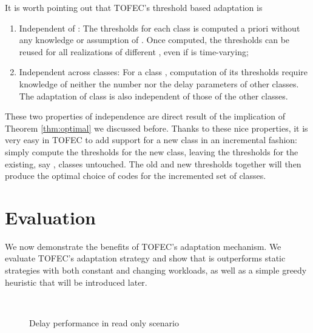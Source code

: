 \documentclass[journal]{IEEEtran}
\newcommand{\ourproposal}{TOFEC\xspace}
\newcommand{\onewidth}{0.74\columnwidth}
\begin{document}
It is worth pointing out that \ourproposal's threshold based adaptation is 
\begin{enumerate}
	\item Independent of : The thresholds for each class is computed a priori without any knowledge or assumption of . Once computed, the thresholds can be reused for all realizations of different , even if  is time-varying;
	\item Independent across classes: For a class , computation of its thresholds  require knowledge of neither the number nor the delay parameters of other classes. The adaptation of class  is also independent of those of the other classes.
\end{enumerate}
These two properties of independence are direct result of the implication of Theorem \ref{thm:optimal} we discussed before.
Thanks to these nice properties, it is very easy in \ourproposal to add support for a new class in an incremental fashion: simply compute the thresholds for the new class, leaving the thresholds for the existing, say , classes untouched. The old and new thresholds together will then produce the optimal choice of codes for the incremented set of  classes.






\section{Evaluation}
\label{sec:evaluation}

We now demonstrate the benefits of \ourproposal 's adaptation mechanism. 
We evaluate \ourproposal's adaptation strategy and show that is outperforms static strategies with both constant and changing workloads, as well as a simple greedy heuristic that will be introduced later.








\begin{figure*}[!t]
\centering
\null\hfill
	\hfill
\hfill\null
\\
\null\hfill
\hfill
\hfill\null
\caption{Delay performance in read only scenario}
\label{fig:read}
\end{figure*}
\end{document}
